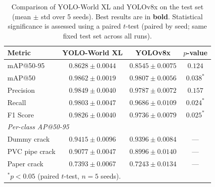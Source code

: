 \begin{table}[ht]
\centering
\caption{Comparison of YOLO-World XL and YOLOv8x on the test set (mean $\pm$ std over 5 seeds). Best results are in \textbf{bold}. Statistical significance is assessed using a paired $t$-test (paired by seed; same fixed test set across all runs).}
\label{tab:model_comparison}
\begin{tabular}{lccc}
\toprule
Metric & YOLO-World XL & YOLOv8x & $p$-value \\
\midrule
mAP@50-95       & \textbf{$0.8628 \pm 0.0044$} & $0.8545 \pm 0.0075$ & $0.124$ \\
mAP@50          & \textbf{$0.9862 \pm 0.0019$} & $0.9807 \pm 0.0056$ & $0.038^{*}$ \\
Precision       & \textbf{$0.9849 \pm 0.0040$} & $0.9787 \pm 0.0072$ & $0.157$ \\
Recall          & \textbf{$0.9803 \pm 0.0047$} & $0.9686 \pm 0.0109$ & $0.024^{*}$ \\
F1 Score        & \textbf{$0.9826 \pm 0.0040$} & $0.9736 \pm 0.0079$ & $0.025^{*}$ \\
\midrule
\multicolumn{4}{l}{\textit{Per-class AP@50-95}} \\
\midrule
Dummy crack     & \textbf{$0.9415 \pm 0.0096$} & $0.9396 \pm 0.0084$ & --- \\
PVC pipe crack  & \textbf{$0.9077 \pm 0.0047$} & $0.8996 \pm 0.0140$ & --- \\
Paper crack     & \textbf{$0.7393 \pm 0.0067$} & $0.7243 \pm 0.0134$ & --- \\
\bottomrule
\multicolumn{4}{l}{\footnotesize $^{*}p < 0.05$ (paired $t$-test, $n=5$ seeds).} \\
\end{tabular}
\end{table}
